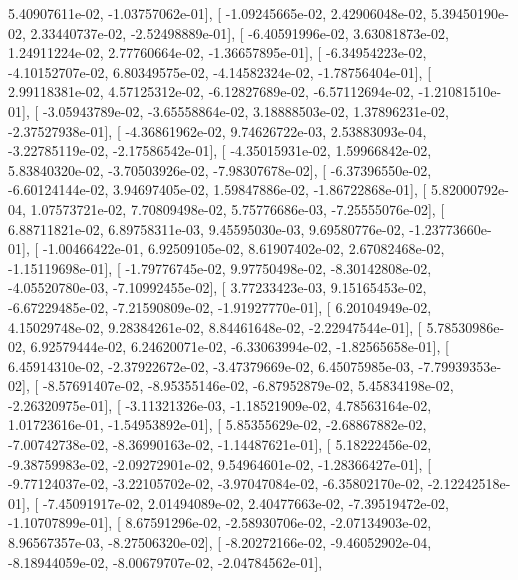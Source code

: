 \documentclass{article}
\begin{document}
          5.40907611e-02,  -1.03757062e-01],
       [ -1.09245665e-02,   2.42906048e-02,   5.39450190e-02,
          2.33440737e-02,  -2.52498889e-01],
       [ -6.40591996e-02,   3.63081873e-02,   1.24911224e-02,
          2.77760664e-02,  -1.36657895e-01],
       [ -6.34954223e-02,  -4.10152707e-02,   6.80349575e-02,
         -4.14582324e-02,  -1.78756404e-01],
       [  2.99118381e-02,   4.57125312e-02,  -6.12827689e-02,
         -6.57112694e-02,  -1.21081510e-01],
       [ -3.05943789e-02,  -3.65558864e-02,   3.18888503e-02,
          1.37896231e-02,  -2.37527938e-01],
       [ -4.36861962e-02,   9.74626722e-03,   2.53883093e-04,
         -3.22785119e-02,  -2.17586542e-01],
       [ -4.35015931e-02,   1.59966842e-02,   5.83840320e-02,
         -3.70503926e-02,  -7.98307678e-02],
       [ -6.37396550e-02,  -6.60124144e-02,   3.94697405e-02,
          1.59847886e-02,  -1.86722868e-01],
       [  5.82000792e-04,   1.07573721e-02,   7.70809498e-02,
          5.75776686e-03,  -7.25555076e-02],
       [  6.88711821e-02,   6.89758311e-03,   9.45595030e-03,
          9.69580776e-02,  -1.23773660e-01],
       [ -1.00466422e-01,   6.92509105e-02,   8.61907402e-02,
          2.67082468e-02,  -1.15119698e-01],
       [ -1.79776745e-02,   9.97750498e-02,  -8.30142808e-02,
         -4.05520780e-03,  -7.10992455e-02],
       [  3.77233423e-03,   9.15165453e-02,  -6.67229485e-02,
         -7.21590809e-02,  -1.91927770e-01],
       [  6.20104949e-02,   4.15029748e-02,   9.28384261e-02,
          8.84461648e-02,  -2.22947544e-01],
       [  5.78530986e-02,   6.92579444e-02,   6.24620071e-02,
         -6.33063994e-02,  -1.82565658e-01],
       [  6.45914310e-02,  -2.37922672e-02,  -3.47379669e-02,
          6.45075985e-03,  -7.79939353e-02],
       [ -8.57691407e-02,  -8.95355146e-02,  -6.87952879e-02,
          5.45834198e-02,  -2.26320975e-01],
       [ -3.11321326e-03,  -1.18521909e-02,   4.78563164e-02,
          1.01723616e-01,  -1.54953892e-01],
       [  5.85355629e-02,  -2.68867882e-02,  -7.00742738e-02,
         -8.36990163e-02,  -1.14487621e-01],
       [  5.18222456e-02,  -9.38759983e-02,  -2.09272901e-02,
          9.54964601e-02,  -1.28366427e-01],
       [ -9.77124037e-02,  -3.22105702e-02,  -3.97047084e-02,
         -6.35802170e-02,  -2.12242518e-01],
       [ -7.45091917e-02,   2.01494089e-02,   2.40477663e-02,
         -7.39519472e-02,  -1.10707899e-01],
       [  8.67591296e-02,  -2.58930706e-02,  -2.07134903e-02,
          8.96567357e-03,  -8.27506320e-02],
       [ -8.20272166e-02,  -9.46052902e-04,  -8.18944059e-02,
         -8.00679707e-02,  -2.04784562e-01],
\end{document}
